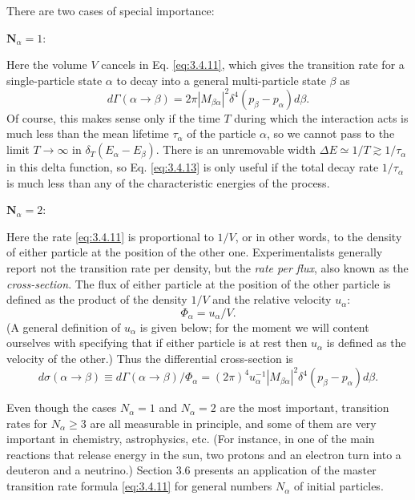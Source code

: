 There are two cases of special importance:

\noindent$\mathbf{N}_{\alpha}=1:$

Here the volume $V$ cancels in Eq. \eqref{eq:3.4.11}, which gives the transition rate for a single-particle
state $\alpha$ to decay into a general multi-particle state $\beta$ as
\begin{equation}
 d\Gamma(\alpha\to\beta)=2\pi|M_{\beta\alpha}|^2
 \delta^4(p_\beta-p_\alpha)d\beta.
 \tag{3.4.13}\label{eq:3.4.13}
\end{equation}
Of course, this makes sense only if the time $T$ during which the interaction acts is much less
than the mean lifetime $\tau_\alpha$ of the particle $\alpha$, so we cannot pass to the limit
$T\to\infty$ in $\delta_T(E_\alpha-E_\beta)$. There is an unremovable width
$\Delta E\simeq1/T\gtrsim1/\tau_\alpha$ in this delta function, so Eq. \eqref{eq:3.4.13} is only useful
if the total decay rate $1/\tau_\alpha$ is much less than any of the characteristic energies of
the process.

\noindent$\mathbf{N}_{\alpha}=2:$

Here the rate \eqref{eq:3.4.11} is proportional to $1/V$, or in other words, to the density of either
particle at the position of the other one. Experimentalists generally report not the transition
rate per density, but the \emph{rate per flux}, also known as the \emph{cross-section}. The flux
of either particle at the position of the other particle is defined as the product of the density
$1/V$ and the relative velocity $u_\alpha$:
\begin{equation}
 \Phi_\alpha=u_\alpha/V.
 \tag{3.4.14}\label{eq:3.4.14}
\end{equation}
(A general definition of $u_\alpha$ is given below; for the moment we will content ourselves with
specifying that if either particle is at rest then $u_\alpha$ is defined as the velocity of the
other.) Thus the differential cross-section is
\begin{equation}
 d\sigma(\alpha\to\beta)\equiv d\Gamma(\alpha\to\beta)/\Phi_\alpha
 =(2\pi)^4u_\alpha^{-1}|M_{\beta\alpha}|^2
 \delta^4(p_\beta-p_\alpha)d\beta.
 \tag{3.4.15}\label{eq:3.4.15}
\end{equation}

Even though the cases $N_\alpha=1$ and $N_\alpha=2$ are the most important, transition rates
for $N_\alpha\geq3$ are all measurable in principle, and some of them are very important in
chemistry, astrophysics, etc. (For instance, in one of the main reactions that release energy
in the sun, two protons and an electron turn into a deuteron and a neutrino.) Section 3.6 presents
an application of the master transition rate formula \eqref{eq:3.4.11} for general numbers $N_\alpha$ of
initial particles.

